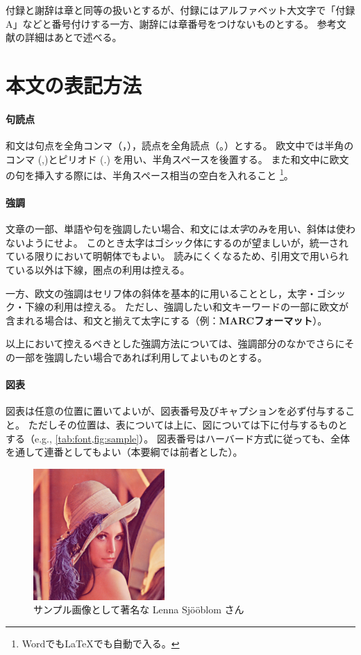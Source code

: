 		付録と謝辞は章と同等の扱いとするが、付録にはアルファベット大文字で「付録A」などと番号付けする一方、謝辞には章番号をつけないものとする。
		参考文献の詳細はあとで述べる。

	\section{本文の表記方法}
		\label{sec:writing_manner}

		\paragraph{句読点}
			\label{par:punct}

			和文は句点を全角コンマ（，），読点を全角読点（。）とする。
			欧文中では半角のコンマ (,)とピリオド (.) を用い、半角スペースを後置する。
			また和文中に欧文の句を挿入する際には、半角スペース相当の空白を入れること
			\footnote{WordでもLaTeXでも自動で入る。}。

		\paragraph{強調}
			\label{par:inline_markup}

			文章の一部、単語や句を強調したい場合、和文には\emph{太字}のみを用い、斜体は使わないようにせよ。
			このとき太字はゴシック体にするのが望ましいが，統一されている限りにおいて明朝体でもよい。
			読みにくくなるため、引用文で用いられている以外は下線，圏点の利用は控える。

			一方、欧文の強調はセリフ体の斜体を基本的に用いることとし，太字・ゴシック・下線の利用は控える。
			ただし、強調したい和文キーワードの一部に欧文が含まれる場合は、和文と揃えて太字にする（例：\textbf{MARCフォーマット}）。

			以上において控えるべきとした強調方法については、強調部分のなかでさらにその一部を強調したい場合であれば利用してよいものとする。

		\paragraph{図表}
			\label{par:fig_tab}

			図表は任意の位置に置いてよいが、図表番号及びキャプションを必ず付与すること。
			ただしその位置は、表については上に、図については下に付与するものとする（e.g., \cref{tab:font,fig:sample}）。
			図表番号はハーバード方式に従っても、全体を通して連番としてもよい（本要綱では前者とした）。

			\begin{figure}[tb]
				\centering
				\includegraphics[width=5cm]{figure/Lenna.png}
				\caption{サンプル画像として著名な Lenna Sjööblom さん}
				\label{fig:sample}
			\end{figure}

